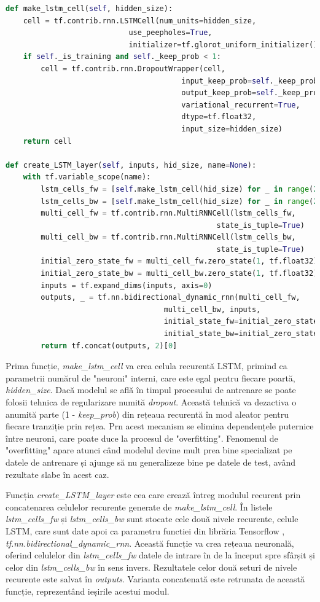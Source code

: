 \documentclass[a4paper,12pt]{book}
\begin{document}
				\begin{lstlisting}[language=Python, caption={Implementarea celulelor LSTM bidirectionale pe doua nivele folosind procedurile specifice ale librariei Tensorflow.}, xleftmargin=0cm]
def make_lstm_cell(self, hidden_size):
	cell = tf.contrib.rnn.LSTMCell(num_units=hidden_size, 
							use_peepholes=True, 		
							initializer=tf.glorot_uniform_initializer())
	if self._is_training and self._keep_prob < 1:
		cell = tf.contrib.rnn.DropoutWrapper(cell, 
										input_keep_prob=self._keep_prob,
										output_keep_prob=self._keep_prob, 
										variational_recurrent=True, 
										dtype=tf.float32, 
										input_size=hidden_size)
	return cell

def create_LSTM_layer(self, inputs, hid_size, name=None):
	with tf.variable_scope(name):
		lstm_cells_fw = [self.make_lstm_cell(hid_size) for _ in range(2)]
		lstm_cells_bw = [self.make_lstm_cell(hid_size) for _ in range(2)]
		multi_cell_fw = tf.contrib.rnn.MultiRNNCell(lstm_cells_fw, 
												state_is_tuple=True)
		multi_cell_bw = tf.contrib.rnn.MultiRNNCell(lstm_cells_bw, 
												state_is_tuple=True)
		initial_zero_state_fw = multi_cell_fw.zero_state(1, tf.float32)
		initial_zero_state_bw = multi_cell_bw.zero_state(1, tf.float32)
		inputs = tf.expand_dims(inputs, axis=0)
		outputs, _ = tf.nn.bidirectional_dynamic_rnn(multi_cell_fw, 
									multi_cell_bw, inputs, 
									initial_state_fw=initial_zero_state_fw, 
									initial_state_bw=initial_zero_state_bw)
		return tf.concat(outputs, 2)[0]				\end{lstlisting}
		Prima funcție, \textit{make\_lstm\_cell} va crea celula recurentă LSTM, primind ca parametrii numărul de "neuroni" interni, care este egal pentru fiecare poartă, \textit{hidden\_size}. Dacă modelul se află în timpul procesului de antrenare se poate folosii tehnica de regularizare numită \textit{dropout}. Această tehnică va dezactiva o anumită parte (1 - \textit{keep\_prob}) din rețeaua recurentă în mod aleator pentru fiecare tranziție prin rețea. Prn acest mecanism se elimina dependențele puternice între neuroni, care poate duce la procesul de "overfitting". Fenomenul de "overfitting" apare atunci când modelul devine mult prea bine specializat pe datele de antrenare și ajunge să nu generalizeze bine pe datele de test, având rezultate slabe în acest caz. \par
		Funcția \textit{create\_LSTM\_layer} este cea care crează întreg modulul recurent prin concatenarea celulelor recurente generate de  \textit{make\_lstm\_cell}. În listele \textit{lstm\_cells\_fw} și \textit{lstm\_cells\_bw} sunt stocate cele două nivele recurente, celule LSTM,  care sunt date apoi ca parametru functiei din librăria Tensorflow \cite{tensorflow}, \textit{tf.nn.bidirectional\_dynamic\_rnn}. Această funcție va crea rețeaua neuronală, oferind celulelor din \textit{lstm\_cells\_fw} datele de intrare în de la început spre sfârșit și celor din \textit{lstm\_cells\_bw} în sens invers. Rezultatele celor două seturi de nivele recurente este salvat în \textit{outputs}. Varianta concatenată este retrunata de această funcție, reprezentând ieșirile acestui modul. \par
		
\end{document}
